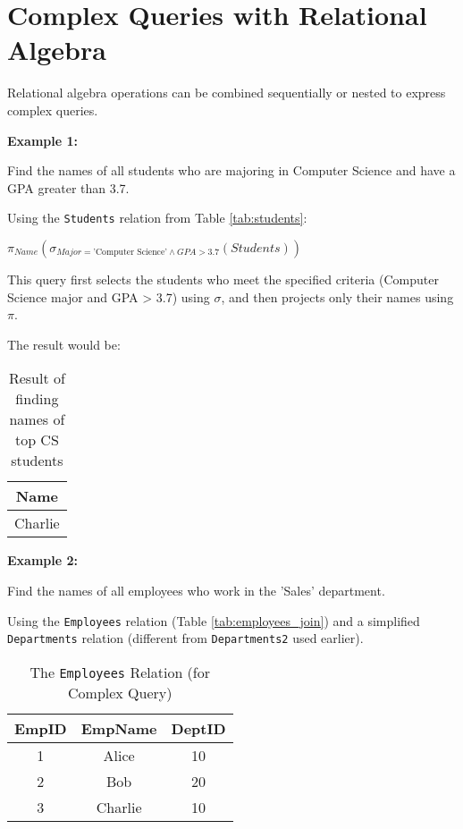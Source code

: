 \documentclass[12pt]{book}
\begin{document}
\section{Complex Queries with Relational Algebra}

Relational algebra operations can be combined sequentially or nested to express complex queries.

\textbf{Example 1:}

Find the names of all students who are majoring in Computer Science and have a GPA greater than 3.7.

Using the \texttt{Students} relation from Table \ref{tab:students}:

$\pi_{\textit{Name}}(\sigma_{\textit{Major} = \text{'Computer Science'} \land \textit{GPA} > 3.7}(\mathit{Students}))$

This query first selects the students who meet the specified criteria (Computer Science major and GPA > 3.7) using $\sigma$, and then projects only their names using $\pi$.

The result would be:

\begin{table}[htbp]
\centering
\begin{tabular}{@{}c@{}}
\toprule
Name \\
\midrule
Charlie \\
\bottomrule
\end{tabular}
\caption{Result of finding names of top CS students}
\label{tab:complex_query1_result}
\end{table}

\textbf{Example 2:}

Find the names of all employees who work in the 'Sales' department.

Using the \texttt{Employees} relation (Table \ref{tab:employees_join}) and a simplified \texttt{Departments} relation (different from \texttt{Departments2} used earlier).

\begin{table}[htbp]
\centering
\begin{tabular}{@{}ccc@{}}
\toprule
EmpID & EmpName & DeptID \\
\midrule
1 & Alice & 10 \\
2 & Bob & 20 \\
3 & Charlie & 10 \\
\bottomrule
\end{tabular}
\caption{The \texttt{Employees} Relation (for Complex Query)}
\label{tab:employees_complex_query}
\end{table}
\end{document}
